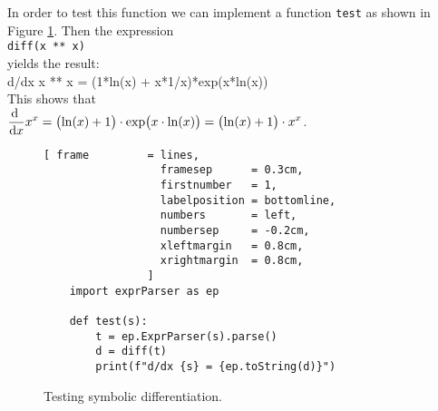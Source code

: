 In order to test this function we can implement a function \texttt{test} as shown in Figure \ref{fig:test-diff.py}.
Then the expression
\\[0.2cm]
\hspace*{1.3cm}
\texttt{diff(x ** x)}
\\[0.2cm]
yields the result:
\\[0.2cm]
\hspace*{1.3cm}
d/dx x ** x = (1*ln(x) + x*1/x)*exp(x*ln(x))
\\[0.2cm]
This shows that
\\[0.2cm]
\hspace*{1.3cm}
$\displaystyle \frac{\mathrm{d}\;}{\mathrm{d}x} x^x = \bigl(\ln(x) + 1\bigr) \cdot \exp\bigl(x \cdot \ln(x)\bigr) =
 \bigl(\ln(x) + 1\bigr) \cdot x^x
$.


\begin{figure}[!ht]
\centering
\begin{Verbatim}[ frame         = lines, 
                  framesep      = 0.3cm, 
                  firstnumber   = 1,
                  labelposition = bottomline,
                  numbers       = left,
                  numbersep     = -0.2cm,
                  xleftmargin   = 0.8cm,
                  xrightmargin  = 0.8cm,
                ]
    import exprParser as ep

    def test(s):
        t = ep.ExprParser(s).parse()
        d = diff(t)
        print(f"d/dx {s} = {ep.toString(d)}")
\end{Verbatim}
\vspace*{-0.3cm}
\caption{Testing symbolic differentiation.}
\label{fig:test-diff.py}
\end{figure}





